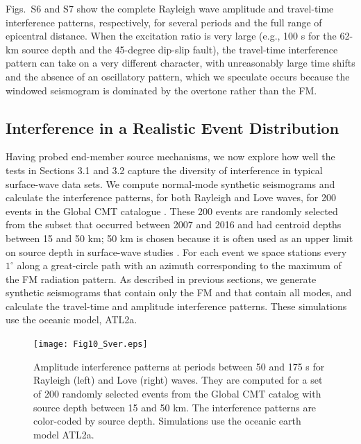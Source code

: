 \documentclass[extra,mreferee]{gji}
\begin{document}
Figs.\ S6 and S7 show the complete Rayleigh wave amplitude and travel-time interference patterns, respectively, for several periods and the full range of epicentral distance. When the excitation ratio is very large (e.g., 100 s for the 62-km source depth and the 45-degree dip-slip fault), the travel-time interference pattern can take on a very different character, with unreasonably large time shifts and the absence of an oscillatory pattern, which we speculate occurs because the windowed seismogram is dominated by the overtone rather than the FM.

\subsection{Interference in a Realistic Event Distribution}

Having probed end-member source mechanisms, we now explore how well the tests in Sections 3.1 and 3.2 capture the diversity of interference in typical surface-wave data sets. We compute normal-mode synthetic seismograms and calculate the interference patterns, for both Rayleigh and Love waves, for 200 events in the Global CMT catalogue \citep{dziewonski1981determination,ekstrom2012global}. These 200 events are randomly selected from the subset that occurred between 2007 and 2016 and had centroid depths between 15 and 50 km; 50 km is chosen because it is often used as an upper limit on source depth in surface-wave studies \citep{xbaoattenuationsurfacewaves, eddy2018age, babikoff2019long}. For each event we  space stations every $1^\circ$ along a great-circle path with an azimuth corresponding to the maximum of the FM radiation pattern. As described in previous sections, we generate synthetic seismograms that contain only the FM and that contain all modes, and calculate the travel-time and amplitude interference patterns. These simulations use the oceanic model, ATL2a.

\begin{figure}
 \texttt{[image: Fig10\_Sver.eps]}
 \caption{Amplitude interference patterns at periods between 50 and 175 s for Rayleigh (left) and Love (right) waves. They are computed for a set of 200 randomly selected events from the Global CMT catalog with source depth between 15 and 50 km. The interference patterns are color-coded by source depth. Simulations use the oceanic earth model ATL2a.}
\end{figure}
\end{document}
